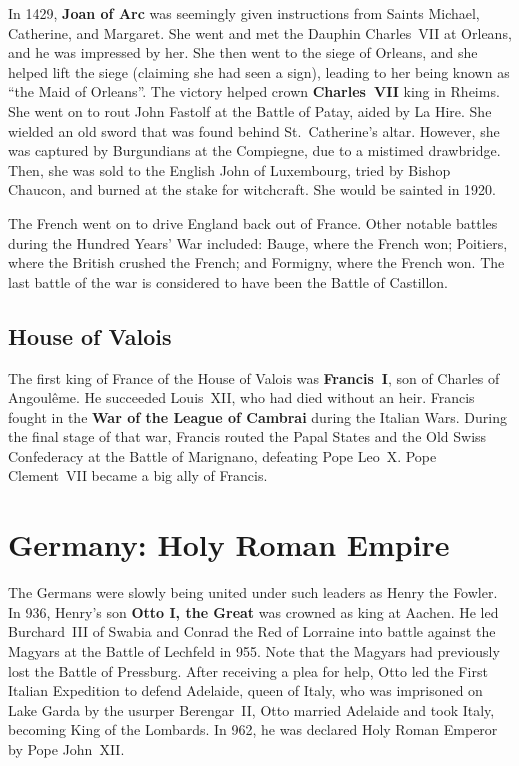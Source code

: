 In 1429, \textbf{Joan of Arc} was seemingly given instructions from Saints Michael, Catherine, and Margaret.
She went and met the Dauphin Charles~VII at Orleans, and he was impressed by her.
She then went to the siege of Orleans, and she helped lift the siege (claiming she had seen a sign),
leading to her being known as ``the Maid of Orleans''.
The victory helped crown \textbf{Charles~VII} king in Rheims.
She went on to rout John Fastolf at the Battle of Patay, aided by La Hire.
She wielded an old sword that was found behind St.\ Catherine's altar.
However, she was captured by Burgundians at the Compiegne, due to a mistimed drawbridge.
Then, she was sold to the English John of Luxembourg, tried by Bishop Chaucon, and burned at the stake for witchcraft.
She would be sainted in 1920.

The French went on to drive England back out of France.
Other notable battles during the Hundred Years' War included:
Bauge, where the French won;
Poitiers, where the British crushed the French;
and Formigny, where the French won.
The last battle of the war is considered to have been the Battle of Castillon.

\subsection*{House of Valois}

The first king of France of the House of Valois was \textbf{Francis~I}, son of Charles of Angoul\^eme.
He succeeded Louis~XII, who had died without an heir.
Francis fought in the \textbf{War of the League of Cambrai} during the Italian Wars.
During the final stage of that war, Francis routed the Papal States and the Old Swiss Confederacy
at the Battle of Marignano, defeating Pope Leo~X.
Pope Clement~VII became a big ally of Francis.

\section{Germany: Holy Roman Empire}

The Germans were slowly being united under such leaders as Henry the Fowler.
In 936, Henry's son \textbf{Otto I, the Great} was crowned as king at Aachen.
He led Burchard~III of Swabia and Conrad the Red of Lorraine into battle
against the Magyars at the Battle of Lechfeld in 955.
Note that the Magyars had previously lost the Battle of Pressburg.
After receiving a plea for help, Otto led the First Italian Expedition to defend Adelaide, queen of Italy,
who was imprisoned on Lake Garda by the usurper Berengar~II,
Otto married Adelaide and took Italy, becoming King of the Lombards.
In 962, he was declared Holy Roman Emperor by Pope John~XII\@.

